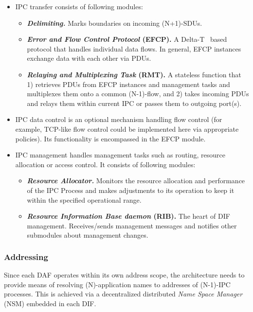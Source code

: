                 \begin{itemize}
                    \item IPC transfer consists of following modules:
                    \begin{itemize}
                        \item \textbf{\emph{Delimiting.}} Marks boundaries on incoming (N+1)-SDUs.
                        \item \textbf{\emph{Error and Flow Control Protocol} (EFCP).} A Delta-T~\cite{deltat} based protocol that handles individual data flows. In general, EFCP instances exchange data with each other via PDUs.
                        \item \textbf{\emph{Relaying and Multiplexing Task} (RMT).} A stateless function that 1) retrieves PDUs from EFCP instances and management tasks and multiplexes them onto a common (N-1)-flow, and 2) takes incoming PDUs and relays them within current IPC or passes them to outgoing port(s).
                    \end{itemize}
                    \item IPC data control is an optional mechanism handling flow control (for example, TCP-like flow control could be implemented here via appropriate policies). Its functionality is encompassed in the EFCP module.
                    \item IPC management handles management tasks such as routing, resource allocation or access control. It consists of following modules:
                    \begin{itemize}
                        \item \textbf{\emph{Resource Allocator.}} Monitors the resource allocation and performance of the IPC Process and makes adjustments to its operation to keep it within the specified operational range.
                        \item \textbf{\emph{Resource Information Base daemon} (RIB).} The heart of DIF management. Receives/sends management messages and notifies other submodules about management changes.
                    \end{itemize}
                \end{itemize}


            \subsubsection{Addressing}

                Since each DAF operates within its own address scope, the architecture needs to provide means of resolving (N)-application names to addresses of (N-1)-IPC processes. This is achieved via a decentralized distributed \emph{Name Space Manager} (NSM) embedded in each DIF.

